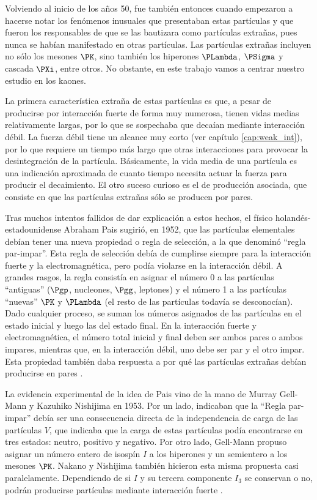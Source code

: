 Volviendo al inicio de los años 50, fue también entonces cuando empezaron a hacerse notar los fenómenos inusuales que presentaban estas partículas y que fueron los responsables de que se las bautizara como partículas extrañas, pues nunca se habían manifestado en otras partículas. Las partículas extrañas incluyen no sólo los mesones $\PK$, sino también los hiperones $\PLambda$, $\PSigma$ y cascada $\PXi$, entre otros. No obstante, en este trabajo vamos a centrar nuestro estudio en los kaones.

La primera característica extraña de estas partículas es que, a pesar de producirse por interacción fuerte de forma muy numerosa, tienen vidas medias relativamente largas, por lo que se sospechaba que decaían mediante interacción débil. La fuerza débil tiene un alcance muy corto (ver capítulo \ref{cap:weak_int}), por lo que requiere un tiempo más largo que otras interacciones para provocar la desintegración de la partícula. Básicamente, la vida media de una partícula es una indicación aproximada de cuanto tiempo necesita actuar la fuerza para producir el decaimiento. El otro suceso curioso es el de producción asociada, que consiste en que las partículas extrañas sólo se producen por pares.  

Tras muchos intentos fallidos de dar explicación a estos hechos, el físico holandés-estadounidense Abraham Pais sugirió, en 1952, que las partículas elementales debían tener una nueva propiedad o regla de selección, a la que denominó ``regla par-impar''. Esta regla de selección debía de cumplirse siempre para la interacción fuerte y la electromagnética, pero podía violarse en la interacción débil. A grandes rasgos, la regla consistía en asignar el número 0 a las partículas ``antiguas'' ($\Pgp$, nucleones, $\Pgg$, leptones) y el número 1 a las partículas ``nuevas'' $\PK$ y $\PLambda$ (el resto de las partículas todavía se desconocían). Dado cualquier proceso, se suman los números asignados de las partículas en el estado inicial y luego las del estado final. En la interacción fuerte y electromagnética, el número total inicial y final deben ser ambos pares o ambos impares, mientras que, en la interacción débil, uno debe ser par y el otro impar. Esta propiedad también daba respuesta a por qué las partículas extrañas debían producirse en pares \cite{Pais}.

La evidencia experimental de la idea de Pais vino de la mano de Murray Gell-Mann y Kazuhiko Nishijima en 1953. Por un lado, indicaban que la ``Regla par-impar'' debía ser una consecuencia directa de la independencia de carga de las partículas $V$, que indicaba que la carga de estas partículas podía encontrarse en tres estados: neutro, positivo y negativo. Por otro lado, Gell-Mann propuso asignar un número entero de isospín $I$ a los hiperones y un semientero a los mesones $\PK$. Nakano y Nishijima también hicieron esta misma propuesta casi paralelamente. Dependiendo de si $I$ y su tercera componente $I_3$ se conservan o no, podrán producirse partículas mediante interacción fuerte \cite{nakano}.

